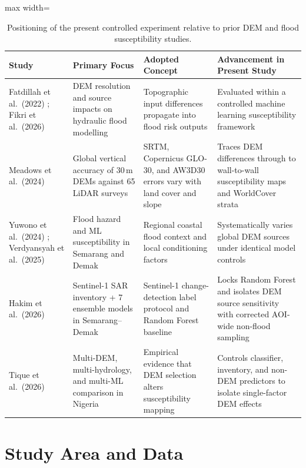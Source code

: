 \documentclass[11pt,twoside]{article}
\begin{document}
\begin{table}[!htbp]
\small
\centering
\caption{Positioning of the present controlled experiment relative to prior DEM and flood susceptibility studies.}
\label{tab:prior-studies}
\begin{adjustbox}{max width=\textwidth}
\begin{tabular}{>{\raggedright}p{3.0cm} >{\raggedright}p{3.6cm} >{\raggedright}p{3.8cm} >{\raggedright\arraybackslash}p{4.4cm}}
\toprule
\textbf{Study} & \textbf{Primary Focus} & \textbf{Adopted Concept} & \textbf{Advancement in Present Study} \\
\midrule
Fatdillah et al.\ (2022) \cite{fatdillah2022}; Fikri et al.\ (2026) \cite{fikri2026} & DEM resolution and source impacts on hydraulic flood modelling & Topographic input differences propagate into flood risk outputs & Evaluated within a controlled machine learning susceptibility framework \\
Meadows et al.\ (2024) \cite{meadows2024} & Global vertical accuracy of 30\,m DEMs against 65 LiDAR surveys & SRTM, Copernicus GLO-30, and AW3D30 errors vary with land cover and slope & Traces DEM differences through to wall-to-wall susceptibility maps and WorldCover strata \\
Yuwono et al.\ (2024) \cite{yuwono2024}; Verdyansyah et al.\ (2025) \cite{verdyansyah2025} & Flood hazard and ML susceptibility in Semarang and Demak & Regional coastal flood context and local conditioning factors & Systematically varies global DEM sources under identical model controls \\
Hakim et al.\ (2026) \cite{hakim2026} & Sentinel-1 SAR inventory + 7 ensemble models in Semarang--Demak & Sentinel-1 change-detection label protocol and Random Forest baseline & Locks Random Forest and isolates DEM source sensitivity with corrected AOI-wide non-flood sampling \\
Tique et al.\ (2026) \cite{Tique2026} & Multi-DEM, multi-hydrology, and multi-ML comparison in Nigeria & Empirical evidence that DEM selection alters susceptibility mapping & Controls classifier, inventory, and non-DEM predictors to isolate single-factor DEM effects \\
\bottomrule
\end{tabular}
\end{adjustbox}
\end{table}

\section{Study Area and Data}\label{sec:study-area-data}
\end{document}
